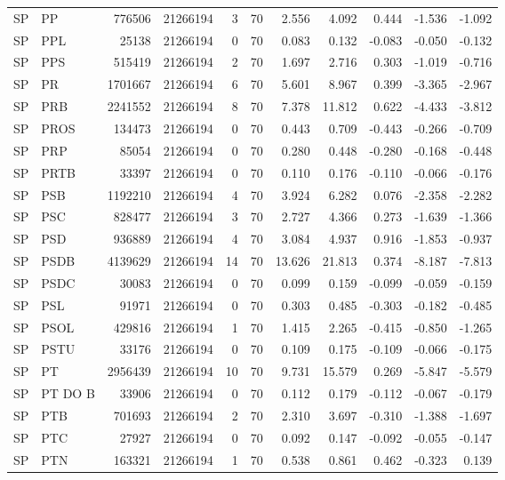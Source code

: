\begin{landscape}
\begin{longtable}{llrrrrrrrrr}
SP & PP & 776506 & 21266194 & 3 & 70 & 2.556 & 4.092 & 0.444 & -1.536 & -1.092 \\
SP & PPL & 25138 & 21266194 & 0 & 70 & 0.083 & 0.132 & -0.083 & -0.050 & -0.132 \\
SP & PPS & 515419 & 21266194 & 2 & 70 & 1.697 & 2.716 & 0.303 & -1.019 & -0.716 \\
SP & PR & 1701667 & 21266194 & 6 & 70 & 5.601 & 8.967 & 0.399 & -3.365 & -2.967 \\
SP & PRB & 2241552 & 21266194 & 8 & 70 & 7.378 & 11.812 & 0.622 & -4.433 & -3.812 \\
SP & PROS & 134473 & 21266194 & 0 & 70 & 0.443 & 0.709 & -0.443 & -0.266 & -0.709 \\
SP & PRP & 85054 & 21266194 & 0 & 70 & 0.280 & 0.448 & -0.280 & -0.168 & -0.448 \\
SP & PRTB & 33397 & 21266194 & 0 & 70 & 0.110 & 0.176 & -0.110 & -0.066 & -0.176 \\
SP & PSB & 1192210 & 21266194 & 4 & 70 & 3.924 & 6.282 & 0.076 & -2.358 & -2.282 \\
SP & PSC & 828477 & 21266194 & 3 & 70 & 2.727 & 4.366 & 0.273 & -1.639 & -1.366 \\
SP & PSD & 936889 & 21266194 & 4 & 70 & 3.084 & 4.937 & 0.916 & -1.853 & -0.937 \\
SP & PSDB & 4139629 & 21266194 & 14 & 70 & 13.626 & 21.813 & 0.374 & -8.187 & -7.813 \\
SP & PSDC & 30083 & 21266194 & 0 & 70 & 0.099 & 0.159 & -0.099 & -0.059 & -0.159 \\
SP & PSL & 91971 & 21266194 & 0 & 70 & 0.303 & 0.485 & -0.303 & -0.182 & -0.485 \\
SP & PSOL & 429816 & 21266194 & 1 & 70 & 1.415 & 2.265 & -0.415 & -0.850 & -1.265 \\
SP & PSTU & 33176 & 21266194 & 0 & 70 & 0.109 & 0.175 & -0.109 & -0.066 & -0.175 \\
SP & PT & 2956439 & 21266194 & 10 & 70 & 9.731 & 15.579 & 0.269 & -5.847 & -5.579 \\
SP & PT DO B & 33906 & 21266194 & 0 & 70 & 0.112 & 0.179 & -0.112 & -0.067 & -0.179 \\
SP & PTB & 701693 & 21266194 & 2 & 70 & 2.310 & 3.697 & -0.310 & -1.388 & -1.697 \\
SP & PTC & 27927 & 21266194 & 0 & 70 & 0.092 & 0.147 & -0.092 & -0.055 & -0.147 \\
SP & PTN & 163321 & 21266194 & 1 & 70 & 0.538 & 0.861 & 0.462 & -0.323 & 0.139 \\

\end{longtable}
\end{landscape}
